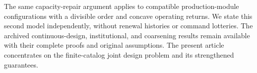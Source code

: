 The same capacity-repair argument applies to compatible production-module configurations with a divisible order and concave operating returns. We state this second model independently, without renewal histories or command lotteries. The archived continuous-design, institutional, and coarsening results remain available with their complete proofs and original assumptions. The present article concentrates on the finite-catalog joint design problem and its strengthened guarantees.
